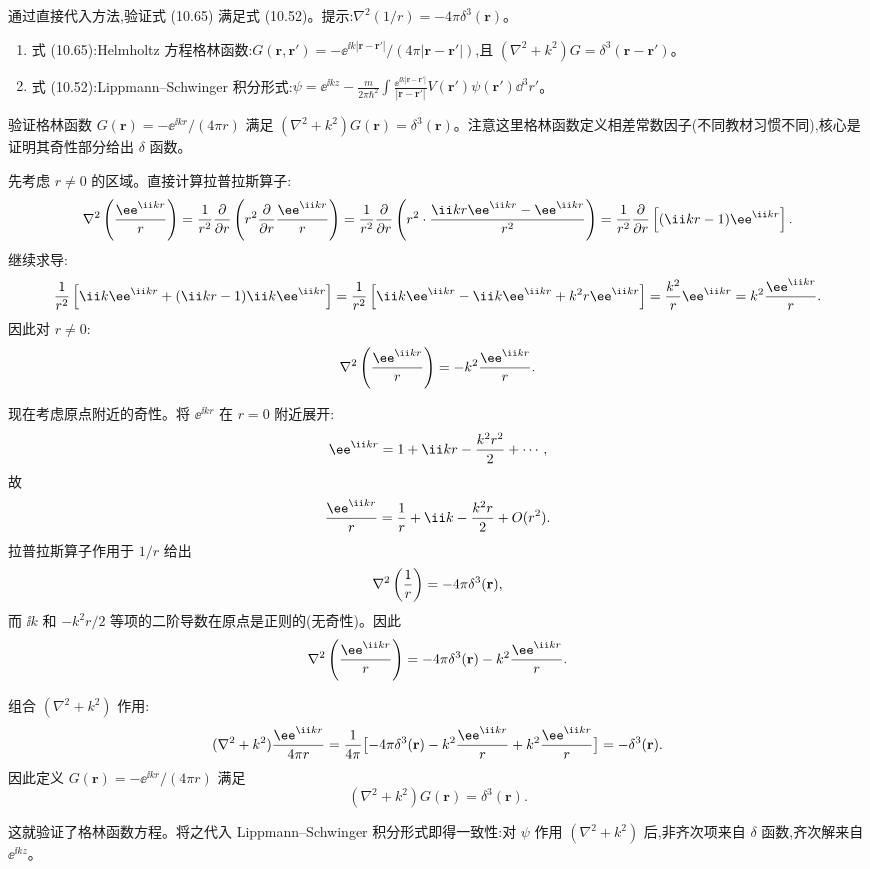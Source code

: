 \begin{question}
通过直接代入方法,验证式 (10.65) 满足式 (10.52)。提示:$\nabla^2(1/r)=-4\pi\delta^3(\mathbf r)$。

\par\smallskip
{}
\begin{enumerate}[leftmargin=2.2em,itemsep=0.12em,topsep=0.12em,parsep=0pt]
\item 式 (10.65):Helmholtz 方程格林函数:$G(\mathbf r,\mathbf r')=-\ee^{\ii k|\mathbf r-\mathbf r'|}/(4\pi|\mathbf r-\mathbf r'|)$,且 $(\nabla^2+k^2)G=\delta^3(\mathbf r-\mathbf r')$。
\item 式 (10.52):Lippmann--Schwinger 积分形式:$\psi=\ee^{\ii kz}-\frac{m}{2\pi\hbar^2}\int \frac{\ee^{\ii k|\mathbf r-\mathbf r'|}}{|\mathbf r-\mathbf r'|}V(\mathbf r')\psi(\mathbf r')\dd^3r'$。
\end{enumerate}

\end{question}
\begin{solution}
验证格林函数 $G(\mathbf r)=-\ee^{\ii kr}/(4\pi r)$ 满足 $(\nabla^2+k^2)G(\mathbf r)=\delta^3(\mathbf r)$。注意这里格林函数定义相差常数因子(不同教材习惯不同),核心是证明其奇性部分给出 $\delta$ 函数。

先考虑 $r\neq0$ 的区域。直接计算拉普拉斯算子:
\[
\nabla^2\left({\ee^{\ii kr}\over r}\right)
={1\over r^2}{\partial\over\partial r}\left(r^2{\partial\over\partial r}{\ee^{\ii kr}\over r}\right)
={1\over r^2}{\partial\over\partial r}\left(r^2\cdot{\ii kr \ee^{\ii kr}-\ee^{\ii kr}\over r^2}\right)
={1\over r^2}{\partial\over\partial r}\left[(\ii kr-1)\ee^{\ii kr}\right].
\]
继续求导:
\[
{1\over r^2}\left[\ii k \ee^{\ii kr}+(\ii kr-1)\ii k \ee^{\ii kr}\right]
={1\over r^2}\left[\ii k \ee^{\ii kr}-\ii k \ee^{\ii kr}+k^2r \ee^{\ii kr}\right]
={k^2\over r}\ee^{\ii kr}=k^2{\ee^{\ii kr}\over r}.
\]
因此对 $r\neq0$:
\[
\nabla^2\left({\ee^{\ii kr}\over r}\right)=-k^2{\ee^{\ii kr}\over r}.
\]

现在考虑原点附近的奇性。将 $\ee^{\ii kr}$ 在 $r=0$ 附近展开:
\[
\ee^{\ii kr}=1+\ii kr-{k^2r^2\over2}+\cdots,
\]
故
\[
{\ee^{\ii kr}\over r}={1\over r}+\ii k-{k^2r\over2}+O(r^2).
\]
拉普拉斯算子作用于 $1/r$ 给出
\[
\nabla^2\left({1\over r}\right)=-4\pi\delta^3(\mathbf r),
\]
而 $\ii k$ 和 $-k^2r/2$ 等项的二阶导数在原点是正则的(无奇性)。因此
\[
\nabla^2\left({\ee^{\ii kr}\over r}\right)=-4\pi\delta^3(\mathbf r)-k^2{\ee^{\ii kr}\over r}.
\]

组合 $(\nabla^2+k^2)$ 作用:
\[
(\nabla^2+k^2){\ee^{\ii kr}\over 4\pi r}
={1\over4\pi}\bigl[-4\pi\delta^3(\mathbf r)-k^2{\ee^{\ii kr}\over r}+k^2{\ee^{\ii kr}\over r}\bigr]
=-\delta^3(\mathbf r).
\]
因此定义 $G(\mathbf r)=-\ee^{\ii kr}/(4\pi r)$ 满足
\[
\boxed{(\nabla^2+k^2)G(\mathbf r)=\delta^3(\mathbf r).}
\]

这就验证了格林函数方程。将之代入 Lippmann--Schwinger 积分形式即得一致性:对 $\psi$ 作用 $(\nabla^2+k^2)$ 后,非齐次项来自 $\delta$ 函数,齐次解来自 $\ee^{\ii kz}$。
\end{solution}

